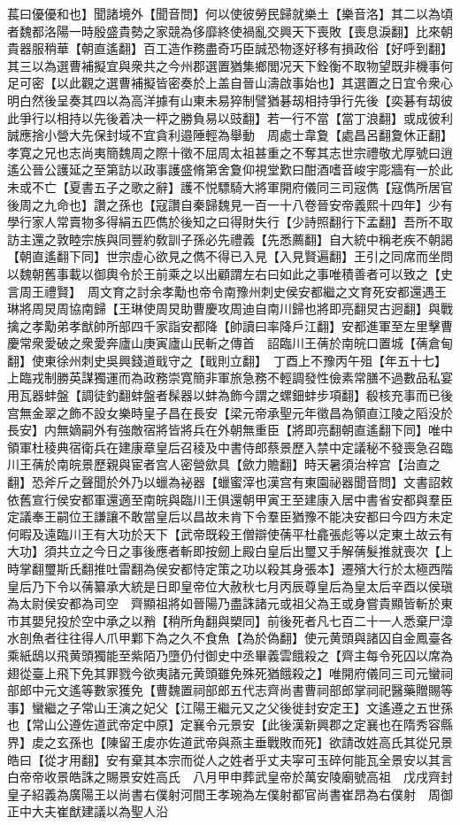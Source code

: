 萇曰優優和也】聞諸境外【聞音問】何以使彼勞民歸就樂土【樂音洛】其二以為頃者魏都洛陽一時殷盛貴勢之家競為侈靡終使禍亂交興天下喪敗【喪息淚翻】比來朝貴器服稍華【朝直遙翻】百工造作務盡奇巧臣誠恐物逐好移有損政俗【好呼到翻】其三以為選曹補擬宜與衆共之今州郡選置猶集鄉閭况天下銓衡不取物望既非機事何足可密【以此觀之選曹補擬皆密奏於上盖自晉山濤啟事始也】其選置之日宜令衆心明白然後呈奏其四以為高洋據有山東未易猝制譬猶碁刼相持爭行先後【奕碁有刼彼此爭行以相持以先後着决一枰之勝負易以豉翻】若一行不當【當丁浪翻】或成彼利誠應捨小營大先保封域不宜貪利邉陲輕為舉動　周處士韋夐【處昌呂翻夐休正翻】孝寛之兄也志尚夷簡魏周之際十徵不屈周太祖甚重之不奪其志世宗禮敬尤厚號曰逍遙公晉公護延之至第訪以政事護盛脩第舍夐仰視堂歎曰酣酒嗜音峻宇彫牆有一於此未或不亡【夏書五子之歌之辭】護不悦驃騎大將軍開府儀同三司宼儁【寇儁所居官後周之九命也】讚之孫也【寇讚自秦歸魏見一百一十八卷晉安帝義熙十四年】少有學行家人常賣物多得絹五匹儁於後知之曰得財失行【少詩照翻行下孟翻】吾所不取訪主還之敦睦宗族與同豐約敎訓子孫必先禮義【先悉薦翻】自大統中稱老疾不朝謁【朝直遙翻下同】世宗虛心欲見之儁不得已入見【入見賢遍翻】王引之同席而坐問以魏朝舊事載以御輿令於王前乘之以出顧謂左右曰如此之事唯積善者可以致之【史言周王禮賢】　周文育之討余孝勱也帝令南豫州刺史侯安都繼之文育死安都還遇王琳將周炅周協南歸【王琳使周炅助曹慶攻周迪自南川歸也將即亮翻炅古迥翻】與戰擒之孝勱弟孝猷帥所部四千家詣安都降【帥讀曰率降戶江翻】安都進軍至左里擊曹慶常衆愛破之衆愛奔廬山庚寅廬山民斬之傳首　詔臨川王蒨於南皖口置城【蒨倉甸翻】使東徐州刺史吳興錢道戢守之【戢則立翻】　丁酉上不豫丙午殂【年五十七】上臨戎制勝英謀獨運而為政務崇寛簡非軍旅急務不輕調發性儉素常膳不過數品私宴用瓦器蚌盤【調徒釣翻蚌盤者髹器以蚌為飾今謂之螺鈿蚌步項翻】殽核充事而已後宫無金翠之飾不設女樂時皇子昌在長安【梁元帝承聖元年徵昌為領直江陵之䧟没於長安】内無嫡嗣外有強敵宿將皆將兵在外朝無重臣【將即亮翻朝直遙翻下同】唯中領軍杜稜典宿衛兵在建康章皇后召稜及中書侍郎蔡景歷入禁中定議秘不發喪急召臨川王蒨於南皖景歷親與宦者宫人密營歛具【歛力贍翻】時天暑須治梓宫【治直之翻】恐斧斤之聲聞於外乃以蠟為袐器【蠟蜜滓也漢宫有東園祕器聞音問】文書詔敕依舊宣行侯安都軍還適至南皖與臨川王俱還朝甲寅王至建康入居中書省安都與羣臣定議奉王嗣位王謙讓不敢當皇后以昌故未肯下令羣臣猶豫不能决安都曰今四方未定何暇及遠臨川王有大功於天下【武帝既殺王僧辯使蒨平杜龕張彪等以定東土故云有大功】須共立之今日之事後應者斬即按劒上殿白皇后出璽又手解蒨髮推就喪次【上時掌翻璽斯氏翻推吐雷翻為侯安都恃定策之功以殺其身張本】遷殯大行於太極西階皇后乃下令以蒨纂承大統是日即皇帝位大赦秋七月丙辰尊皇后為皇太后辛酉以侯瑱為太尉侯安都為司空　齊顯祖將如晉陽乃盡誅諸元或祖父為王或身嘗貴顯皆斬於東市其嬰兒投於空中承之以矟【稍所角翻與槊同】前後死者凡七百二十一人悉棄尸漳水剖魚者往往得人爪甲鄴下為之久不食魚【為於偽翻】使元黄頭與諸囚自金鳳臺各乘紙鴟以飛黄頭獨能至紫陌乃墮仍付御史中丞畢義雲餓殺之【齊主每令死囚以席為翅從臺上飛下免其罪戮今欲夷諸元黄頭雖免殊死猶餓殺之】唯開府儀同三司元蠻祠部郎中元文遙等數家獲免【曹魏置祠部郎五代志齊尚書曹祠部郎掌祠祀醫藥贈賜等事】蠻繼之子常山王演之妃父【江陽王繼元又之父後徙封安定王】文遙遵之五世孫也【常山公遵佐道武帝定中原】定襄令元景安【此後漢新興郡之定襄也在隋秀容縣界】䖍之玄孫也【陳留王䖍亦佐道武帝與燕主垂戰敗而死】欲請改姓高氏其從兄景皓曰【從才用翻】安有棄其本宗而從人之姓者乎丈夫寜可玉碎何能瓦全景安以其言白帝帝收景皓誅之賜景安姓高氏　八月甲申葬武皇帝於萬安陵廟號高祖　戊戌齊封皇子紹義為廣陽王以尚書右僕射河間王孝琬為左僕射都官尚書崔昂為右僕射　周御正中大夫崔猷建議以為聖人沿